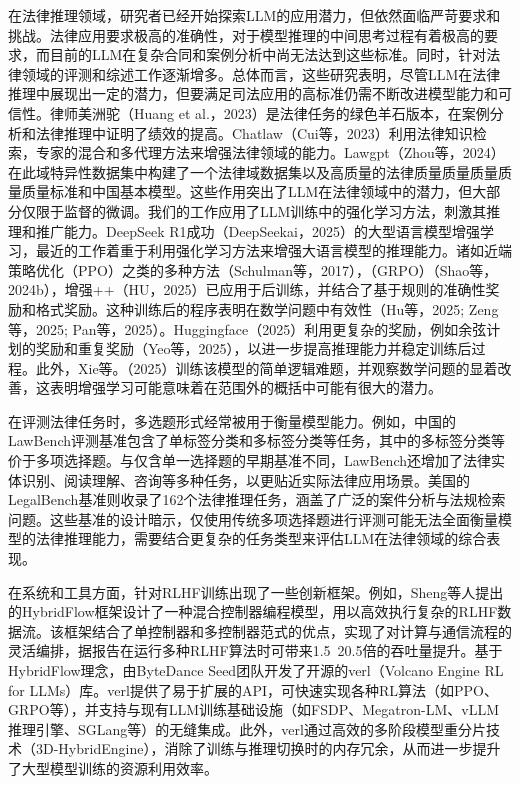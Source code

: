 \documentclass{pkuthesis}
\begin{document}
在法律推理领域，研究者已经开始探索LLM的应用潜力，但依然面临严苛要求和挑战。法律应用要求极高的准确性，对于模型推理的中间思考过程有着极高的要求，而目前的LLM在复杂合同和案例分析中尚无法达到这些标准。同时，针对法律领域的评测和综述工作逐渐增多。总体而言，这些研究表明，尽管LLM在法律推理中展现出一定的潜力，但要满足司法应用的高标准仍需不断改进模型能力和可信性。律师美洲驼（Huang et al.，2023）是法律任务的绿色羊石版本，在案例分析和法律推理中证明了绩效的提高。Chatlaw（Cui等，2023）利用法律知识检索，专家的混合和多代理方法来增强法律领域的能力。Lawgpt（Zhou等，2024）在此域特异性数据集中构建了一个法律域数据集以及高质量的法律质量质量质量质量质量标准和中国基本模型。这些作用突出了LLM在法律领域中的潜力，但大部分仅限于监督的微调。我们的工作应用了LLM训练中的强化学习方法，刺激其推理和推广能力。DeepSeek R1成功（DeepSeekai，2025）的大型语言模型增强学习，最近的工作着重于利用强化学习方法来增强大语言模型的推理能力。诸如近端策略优化（PPO）之类的多种方法（Schulman等，2017），（GRPO）（Shao等，2024b），增强++（HU，2025）已应用于后训练，并结合了基于规则的准确性奖励和格式奖励。这种训练后的程序表明在数学问题中有效性（Hu等，2025; Zeng等，2025; Pan等，2025）。Huggingface（2025）利用更复杂的奖励，例如余弦计划的奖励和重复奖励（Yeo等，2025），以进一步提高推理能力并稳定训练后过程。此外，Xie等。（2025）训练该模型的简单逻辑难题，并观察数学问题的显着改善，这表明增强学习可能意味着在范围外的概括中可能有很大的潜力。

在评测法律任务时，多选题形式经常被用于衡量模型能力。例如，中国的LawBench评测基准包含了单标签分类和多标签分类等任务，其中的多标签分类等价于多项选择题。与仅含单一选择题的早期基准不同，LawBench还增加了法律实体识别、阅读理解、咨询等多种任务，以更贴近实际法律应用场景。美国的LegalBench基准则收录了162个法律推理任务，涵盖了广泛的案件分析与法规检索问题。这些基准的设计暗示，仅使用传统多项选择题进行评测可能无法全面衡量模型的法律推理能力，需要结合更复杂的任务类型来评估LLM在法律领域的综合表现。

在系统和工具方面，针对RLHF训练出现了一些创新框架。例如，Sheng等人提出的HybridFlow框架设计了一种混合控制器编程模型，用以高效执行复杂的RLHF数据流。该框架结合了单控制器和多控制器范式的优点，实现了对计算与通信流程的灵活编排，据报告在运行多种RLHF算法时可带来1.5~20.5倍的吞吐量提升。基于HybridFlow理念，由ByteDance Seed团队开发了开源的verl（Volcano Engine RL for LLMs）库。verl提供了易于扩展的API，可快速实现各种RL算法（如PPO、GRPO等），并支持与现有LLM训练基础设施（如FSDP、Megatron-LM、vLLM推理引擎、SGLang等）的无缝集成。此外，verl通过高效的多阶段模型重分片技术（3D-HybridEngine），消除了训练与推理切换时的内存冗余，从而进一步提升了大型模型训练的资源利用效率。
\end{document}
